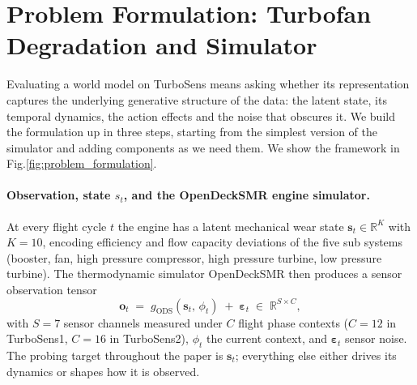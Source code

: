 \documentclass{article}
\begin{document}


\section{Problem Formulation: Turbofan Degradation and Simulator}
\label{sec:formulation}


Evaluating a world model on TurboSens means asking whether its representation captures the underlying generative structure of the data: the latent state, its temporal dynamics, the action effects and the noise that obscures it. We build the formulation up in three steps, starting from the simplest version of the simulator and adding components as we need them. We show the framework in Fig.\ref{fig:problem_formulation}.

\paragraph{Observation, state $s_t$, and the OpenDeckSMR engine simulator.}
At every flight cycle $t$ the engine has a latent mechanical wear state $\mathbf{s}_t \in \mathbb{R}^K$ with $K{=}10$, encoding efficiency and flow capacity deviations of the five sub systems (booster, fan, high pressure compressor, high pressure turbine, low pressure turbine). The thermodynamic simulator OpenDeckSMR then produces a sensor observation tensor
\begin{equation}
    \mathbf{o}_t \;=\; g_\mathrm{ODS}(\mathbf{s}_t,\, \phi_t) \;+\; \boldsymbol{\varepsilon}_t \;\in\; \mathbb{R}^{S \times C},
    \label{eq:obs}
\end{equation}
with $S{=}7$ sensor channels measured under $C$ flight phase contexts ($C{=}12$ in TurboSens1, $C{=}16$ in TurboSens2), $\phi_t$ the current context, and $\boldsymbol{\varepsilon}_t$ sensor noise. The probing target throughout the paper is $\mathbf{s}_t$; everything else either drives its dynamics or shapes how it is observed.
\end{document}
